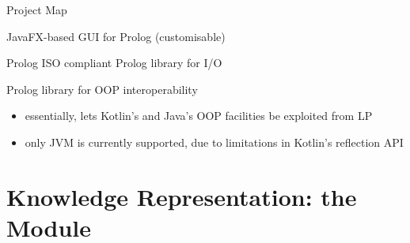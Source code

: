 \documentclass[handout]{beamer}
\begin{document}
\begin{frame}[allowframebreaks]{Project Map}
\begin{description}
        \medskip

        \item[\module{ide}] JavaFX-based GUI for Prolog (customisable)

        \medskip

        \item[\module{io-lib}] Prolog ISO compliant Prolog library for I/O

        \medskip

        \item[\module{oop-lib}] Prolog library for OOP interoperability
        \begin{itemize}\small
            \item essentially, lets Kotlin's and Java's OOP facilities be exploited from LP
            \item only JVM is currently supported, due to limitations in Kotlin's reflection API
        \end{itemize}

    \end{description}
\end{frame}

\section{Knowledge Representation: the  Module}
\end{document}
